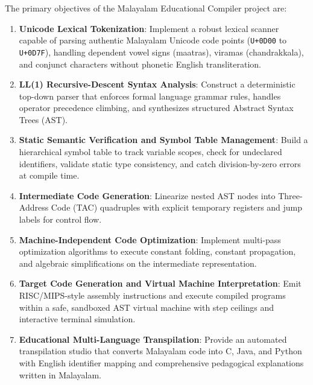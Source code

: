 \documentclass[12pt,a4paper]{report}
\begin{document}
The primary objectives of the Malayalam Educational Compiler project are:

\begin{enumerate}
    \item \textbf{Unicode Lexical Tokenization}: Implement a robust lexical scanner capable of parsing authentic Malayalam Unicode code points (\texttt{U+0D00} to \texttt{U+0D7F}), handling dependent vowel signs (maatras), viramas (chandrakkala), and conjunct characters without phonetic English transliteration.
    
    \item \textbf{LL(1) Recursive-Descent Syntax Analysis}: Construct a deterministic top-down parser that enforces formal language grammar rules, handles operator precedence climbing, and synthesizes structured Abstract Syntax Trees (AST).
    
    \item \textbf{Static Semantic Verification and Symbol Table Management}: Build a hierarchical symbol table to track variable scopes, check for undeclared identifiers, validate static type consistency, and catch division-by-zero errors at compile time.
    
    \item \textbf{Intermediate Code Generation}: Linearize nested AST nodes into Three-Address Code (TAC) quadruples with explicit temporary registers and jump labels for control flow.
    
    \item \textbf{Machine-Independent Code Optimization}: Implement multi-pass optimization algorithms to execute constant folding, constant propagation, and algebraic simplifications on the intermediate representation.
    
    \item \textbf{Target Code Generation and Virtual Machine Interpretation}: Emit RISC/MIPS-style assembly instructions and execute compiled programs within a safe, sandboxed AST virtual machine with step ceilings and interactive terminal simulation.
    
    \item \textbf{Educational Multi-Language Transpilation}: Provide an automated transpilation studio that converts Malayalam code into C, Java, and Python with English identifier mapping and comprehensive pedagogical explanations written in Malayalam.
\end{enumerate}

\newpage
\end{document}

